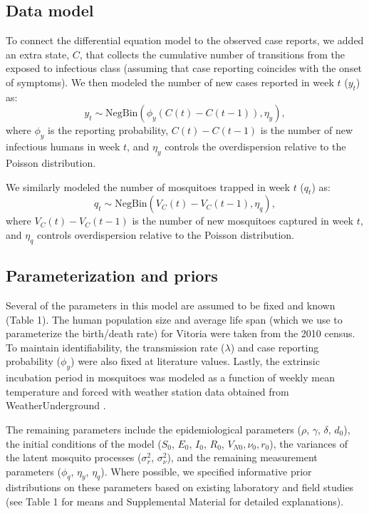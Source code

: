 \documentclass[10pt,letterpaper]{article}
\begin{document}
\subsection*{Data model}

To connect the differential equation model to the observed case reports, we added an extra state, $C$, that collects the cumulative number of transitions from the exposed to infectious class (assuming that case reporting coincides with the onset of symptoms).
We then modeled the number of new cases reported in week $t$ ($y_t$) as:
\begin{equation}
y_t  \sim \text{NegBin}(\phi_y (C(t) - C(t-1)), \eta_y),
\end{equation}
where $\phi_y$ is the reporting probability, $C(t) - C(t-1)$ is the number of new infectious humans in week $t$, and $\eta_y$ controls the overdispersion relative to the Poisson distribution.

We similarly modeled the number of mosquitoes trapped in week $t$ ($q_t$) as:
\begin{equation}
q_t \sim \text{NegBin}(V_{C}(t) - V_{C}(t-1), \eta_q),
\end{equation}
where $V_{C}(t) - V_{C}(t-1)$ is the number of new mosquitoes captured in week $t$, and $\eta_q$ controls overdispersion relative to the Poisson distribution.

\subsection*{Parameterization and priors}

Several of the parameters in this model are assumed to be fixed and known (Table 1).
The human population size and average life span (which we use to parameterize the birth/death rate) for Vitoria were taken from the 2010 census.
To maintain identifiability, the transmission rate ($\lambda$) and case reporting probability ($\phi_y$) were also fixed at literature values.
Lastly, the extrinsic incubation period in mosquitoes was modeled as a function of weekly mean temperature and forced with weather station data obtained from WeatherUnderground \cite{weather}.

The remaining parameters include the epidemiological parameters ($\rho$, $\gamma$, $\delta$, $d_0$), the initial conditions of the model ($S_0$, $E_0$, $I_0$, $R_0$, $V_{N0}, \nu_0, r_0$), the variances of the latent mosquito processes ($\sigma^2_r$, $\sigma^2_{\nu}$), and the remaining measurement parameters ($\phi_q$, $\eta_y$, $\eta_q$).  
Where possible, we specified informative prior distributions on these parameters based on existing laboratory and field studies (see Table 1 for means and Supplemental Material for detailed explanations).
\end{document}
